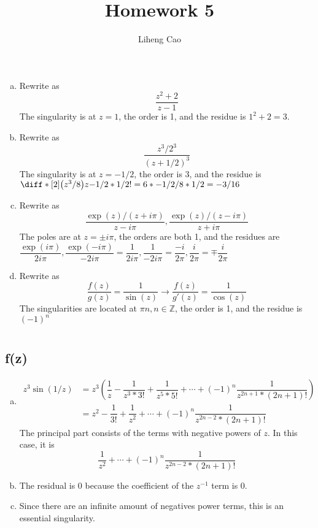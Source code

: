 \documentclass[12pt]{article}
\title{Homework 5}
\author{Liheng Cao}
\begin{document}
\maketitle

\section{}
\begin{enumerate}[(a)]
	\item Rewrite as \[ \dfrac{z^2+2}{z-1} \] The singularity is at $ z=1 $, the order is 1, and the residue is $ 1^2 + 2 = 3 $.
	
	\item Rewrite as \[ \dfrac{z^3/2^3}{(z+1/2)^3} \] The singularity is at $ z=-1/2 $, the order is 3, and the residue is $ \diff*[2]{\left(z^3/8\right)}{z}{-1/2} * 1/2! = 6*-1/2 / 8 * 1/2 = -3/16$
	
	\item Rewrite as \[ \dfrac{\exp{(z)}/(z+i\pi)}{z-i\pi}, \dfrac{\exp{(z)}/(z-i\pi)}{z+i\pi} \] The poles are at $ z = \pm i\pi $, the orders are both 1, and the residues are $ \dfrac{\exp{(i\pi)}}{2i\pi}, \dfrac{\exp{(-i\pi)}}{-2i\pi} = \dfrac{1}{2i\pi}, \dfrac{1}{-2i\pi} = \dfrac{-i}{2\pi}, \dfrac{i}{2\pi} = \mp \dfrac{i}{2\pi}$
	
	\item Rewrite as \[ \dfrac{f(z)}{g(z)} = \dfrac{1}{\sin{(z)}} \longrightarrow \dfrac{f(z)}{g'(z)} = \dfrac{1}{\cos{(z)}} \] The singularities are located at $ \pi n, n \in \mathbb{Z} $, the order is 1, and the residue is $ (-1)^n $
\end{enumerate}
\newpage

\section{}
\subsection{f(z)}
\begin{enumerate}[(a)]
	\item 
	\begin{align*}
		z^3 \sin{(1/z)} &= z^3 \left(\dfrac{1}{z} - \dfrac{1}{z^3 * 3!} + \dfrac{1}{z^5  * 5!} + \cdots + (-1)^n \dfrac{1}{z^{2n+1} * (2n+1)!}\right)\\
		&= z^2 - \dfrac{1}{3!} + \dfrac{1}{z^2} + \cdots + (-1)^n\dfrac{1}{z^{2n-2} * (2n+1)!}
	\end{align*}
	The principal part consists of the terms with negative powers of $ z $. In this case, it is \[ \dfrac{1}{z^2} + \cdots + (-1)^n\dfrac{1}{z^{2n-2} * (2n+1)!} \]
	
	\item The residual is 0 because the coefficient of the $ z^{-1} $ term is 0. 
	
	\item Since there are an infinite amount of negatives power terms, this is an essential singularity.
\end{enumerate}
\end{document}
